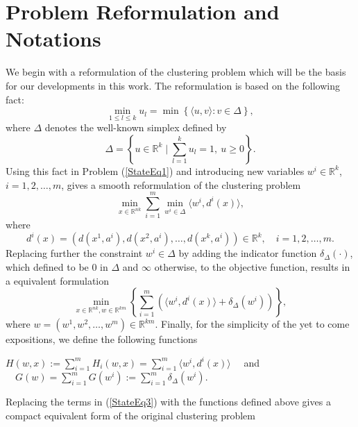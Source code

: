 \documentclass[11pt]{article}
\numberwithin{equation}{section}
\begin{document}
\section{Problem Reformulation and Notations}

We begin with a reformulation of the clustering problem which will be the basis for our developments in this work. The reformulation is based on the following fact:
\begin{equation*}
	\min\limits_{1 \leq l \leq k} u_l = \min \left\lbrace \langle u,v \rangle : v \in \Delta \right\rbrace ,
\end{equation*}
where $\Delta$ denotes the well-known simplex defined by
\begin{equation*}
	\Delta = \left\lbrace u \in \mathbb{R}^k \mid \sum\limits_{l=1}^{k} u_l = 1, \: u \geq 0 \right\rbrace .
\end{equation*}
Using this fact in Problem (\ref{StateEq1}) and introducing new variables $w^i \in \mathbb{R}^k$, $i=1,2, \ldots, m$, gives a smooth reformulation of the clustering problem
\begin{equation}
	\min\limits_{x \in \mathbb{R}^{nk}} \sum\limits_{i=1}^{m} \min\limits_{w^i \in \Delta} \langle w^i , d^i(x) \rangle , \label{StateEq2}
\end{equation}
where 
\begin{equation*}
d^{i}(x) = (d(x^1,a^i), d(x^2,a^i), \ldots , d(x^k,a^i)) \in \mathbb{R}^k, \quad i=1, 2, \ldots , m.
\end{equation*}
Replacing further the constraint $w^i \in \Delta$ by adding the indicator function $\delta_{\Delta}(\cdot)$, which defined to be $0$ in $\Delta$ and $\infty$ otherwise, to the objective function, results in a equivalent formulation
\begin{equation}
	\min\limits_{x \in \mathbb{R}^{nk} , w \in \mathbb{R}^{km}} \left\lbrace \sum\limits_{i=1}^{m} \left( \langle w^i , d^i(x) \rangle + \delta_{\Delta}(w^i) \right) \right\rbrace , \label{StateEq3}
\end{equation}
where $w = (w^1, w^2, \ldots , w^m) \in \mathbb{R}^{km}$.
Finally, for the simplicity of the yet to come expositions, we define the following functions
\begin{center}
$H(w,x) := \sum\limits_{i=1}^{m} H_i(w,x) = \sum\limits_{i=1}^{m} \langle w^i , d^i(x) \rangle \quad$ and $\quad G(w) = \sum\limits_{i=1}^{m} G(w^i) := \sum\limits_{i=1}^{m} \delta_{\Delta}(w^i) .$
\end{center}

Replacing the terms in (\ref{StateEq3}) with the functions defined above gives a compact equivalent form of the original clustering problem
\end{document}

